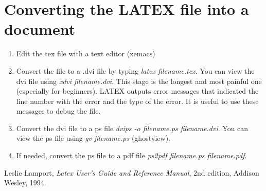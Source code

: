 \documentclass [12pt]{article}
\begin{document}
\section{Converting the LATEX file into a document}
\label{sec:output}
\begin{enumerate}
\item Edit the tex file with a text editor (xemacs)\\
\item Convert the file to a .dvi file by typing {\it latex filename.tex}.
You can view the dvi file using {\it xdvi filename.dvi}. This stage is the longest and most painful one (especially for beginners). LATEX outputs error messages that indicated the line number with the error and the type of the error. It is useful to use these messages to debug the file.\\
\item Convert the dvi file to a ps file {\it dvips -o filename.ps filename.dvi}. You can view the ps file using {\it gv filename.ps} (ghostview).\\
\item If needed, convert the ps file to a pdf file {\it ps2pdf filename.ps filename.pdf}.\\
\end{enumerate}

\begin{thebibliography}{1}
Leslie Lamport, \emph{Latex User's Guide and Reference Manual}, 2nd edition, Addison Wesley, 1994.

\end{thebibliography}
\end{document}
